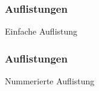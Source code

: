 \begin{frame}
    \frametitle{Auflistungen}
    \begin{block}{Einfache Auflistung}
        
    \end{block}
\end{frame}
\begin{frame}
    \frametitle{Auflistungen}
    \begin{block}{Nummerierte Auflistung}
        
    \end{block}
\end{frame}
